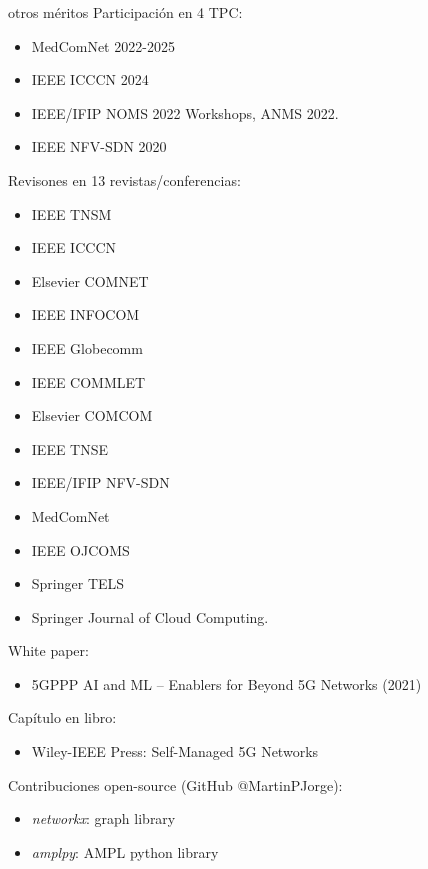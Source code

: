 \documentclass[xcolor=table,xcolor=x11names]{beamer}
\begin{document}
\begin{frame}[allowframebreaks]{\secname}{otros méritos}
    Participación en 4 TPC:
    \begin{itemize}
        \item MedComNet 2022-2025
        \item IEEE ICCCN 2024
        \item IEEE/IFIP NOMS 2022 Workshops, ANMS 2022.
        \item IEEE NFV-SDN 2020
    \end{itemize}

    Revisones en 13 revistas/conferencias:
    \begin{itemize}
        \item IEEE TNSM
        \item IEEE ICCCN
        \item Elsevier COMNET
        \item IEEE INFOCOM
        \item IEEE Globecomm
        \item IEEE COMMLET
        \item Elsevier COMCOM
        \item IEEE TNSE
        \item IEEE/IFIP NFV-SDN
        \item MedComNet
        \item IEEE OJCOMS
        \item Springer TELS
        \item Springer Journal of Cloud Computing.
    \end{itemize}


    White paper:
    \begin{itemize}
        \item 5GPPP AI and ML -- Enablers for Beyond 5G Networks (2021)
    \end{itemize}

    Capítulo en libro:
    \begin{itemize}
        \item Wiley-IEEE Press: Self-Managed 5G Networks
    \end{itemize}


    Contribuciones open-source (GitHub @MartinPJorge):
    \begin{itemize}
        \item \emph{networkx}: graph library
        \item \emph{amplpy}: AMPL python library 
    \end{itemize}


\end{frame}
\end{document}
